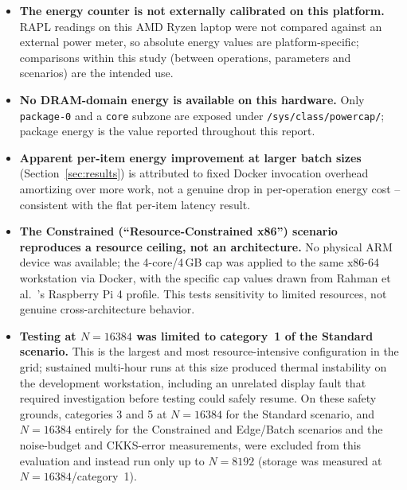 \begin{itemize}[leftmargin=*, itemsep=2pt]
  \item \textbf{The energy counter is not externally calibrated on this platform.} RAPL readings on this AMD Ryzen laptop were not compared against an external power meter, so absolute energy values are platform-specific; comparisons within this study (between operations, parameters and scenarios) are the intended use.
  \item \textbf{No DRAM-domain energy is available on this hardware.} Only \texttt{package-0} and a \texttt{core} subzone are exposed under \texttt{/sys/class/powercap/}; package energy is the value reported throughout this report.
  \item \textbf{Apparent per-item energy improvement at larger batch sizes} (Section~\ref{sec:results}) is attributed to fixed Docker invocation overhead amortizing over more work, not a genuine drop in per-operation energy cost -- consistent with the flat per-item latency result.
  \item \textbf{The Constrained (``Resource-Constrained x86'') scenario reproduces a resource ceiling, not an architecture.} No physical ARM device was available; the 4-core/4\,GB cap was applied to the same x86-64 workstation via Docker, with the specific cap values drawn from Rahman et al.~\cite{rahman2024}'s Raspberry Pi 4 profile. This tests sensitivity to limited resources, not genuine cross-architecture behavior.
  \item \textbf{Testing at $N=16384$ was limited to category~1 of the Standard scenario.} This is the largest and most resource-intensive configuration in the grid; sustained multi-hour runs at this size produced thermal instability on the development workstation, including an unrelated display fault that required investigation before testing could safely resume. On these safety grounds, categories 3 and 5 at $N=16384$ for the Standard scenario, and $N=16384$ entirely for the Constrained and Edge/Batch scenarios and the noise-budget and CKKS-error measurements, were excluded from this evaluation and instead run only up to $N=8192$ (storage was measured at $N=16384$/category~1).
\end{itemize}
